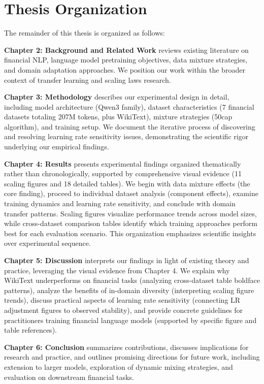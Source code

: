 \section{Thesis Organization}

The remainder of this thesis is organized as follows:

\textbf{Chapter 2: Background and Related Work} reviews existing literature on financial NLP, language model pretraining objectives, data mixture strategies, and domain adaptation approaches. We position our work within the broader context of transfer learning and scaling laws research.

\textbf{Chapter 3: Methodology} describes our experimental design in detail, including model architecture (Qwen3 family), dataset characteristics (7 financial datasets totaling 207M tokens, plus WikiText), mixture strategies (50cap algorithm), and training setup. We document the iterative process of discovering and resolving learning rate sensitivity issues, demonstrating the scientific rigor underlying our empirical findings.

\textbf{Chapter 4: Results} presents experimental findings organized thematically rather than chronologically, supported by comprehensive visual evidence (11 scaling figures and 18 detailed tables). We begin with data mixture effects (the core finding), proceed to individual dataset analysis (component effects), examine training dynamics and learning rate sensitivity, and conclude with domain transfer patterns. Scaling figures visualize performance trends across model sizes, while cross-dataset comparison tables identify which training approaches perform best for each evaluation scenario. This organization emphasizes scientific insights over experimental sequence.

\textbf{Chapter 5: Discussion} interprets our findings in light of existing theory and practice, leveraging the visual evidence from Chapter 4. We explain why WikiText underperforms on financial tasks (analyzing cross-dataset table boldface patterns), analyze the benefits of in-domain diversity (interpreting scaling figure trends), discuss practical aspects of learning rate sensitivity (connecting LR adjustment figures to observed stability), and provide concrete guidelines for practitioners training financial language models (supported by specific figure and table references).

\textbf{Chapter 6: Conclusion} summarizes contributions, discusses implications for research and practice, and outlines promising directions for future work, including extension to larger models, exploration of dynamic mixing strategies, and evaluation on downstream financial tasks.

